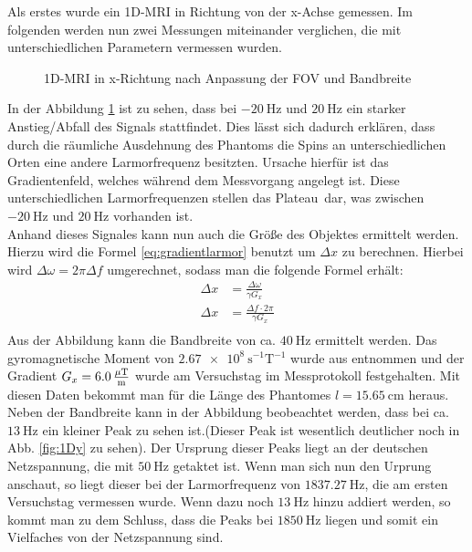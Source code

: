 Als erstes wurde ein 1D-MRI in Richtung von der x-Achse gemessen.
Im folgenden werden nun zwei Messungen miteinander verglichen, die mit unterschiedlichen Parametern vermessen wurden.  
\begin{figure}[H]
    \centering
    
    \caption{1D-MRI in x-Richtung nach Anpassung der FOV und Bandbreite}\label{fig:1Dx}
\end{figure}
In der Abbildung \ref{fig:1Dx} ist zu sehen, dass bei $\SI{-20}{\hertz}$ und $\SI{20}{\hertz}$ ein starker Anstieg/Abfall des Signals stattfindet. Dies lässt sich dadurch erklären, dass durch die räumliche Ausdehnung des Phantoms die Spins an unterschiedlichen Orten eine andere Larmorfrequenz besitzten. Ursache hierfür ist das Gradientenfeld, welches während dem Messvorgang angelegt ist. Diese unterschiedlichen Larmorfrequenzen stellen das \glqq Plateau\grqq \, dar, was zwischen $\SI{-20}{\hertz}$ und $\SI{20}{\hertz}$ vorhanden ist.\\
Anhand dieses Signales kann  nun auch die Größe des Objektes ermittelt werden. Hierzu wird die Formel \ref{eq:gradientlarmor} benutzt um $\Delta x$ zu berechnen. Hierbei wird $\Delta\omega= 2\pi \Delta f$ umgerechnet, sodass man die folgende Formel erhält:
\begin{align}
    \Delta x&=\frac{\Delta\omega}{\gamma G_x}\\
    \Delta x&=\frac{\Delta f \cdot 2\pi}{\gamma G_x}\\
\end{align}\label{eq:FOV}
Aus der Abbildung kann die Bandbreite von ca. $\SI{40}{\hertz}$ ermittelt werden. Das gyromagnetische Moment von $\SI{2.67e8}{\s^{-1}\tesla^{-1}}$ wurde aus \cite{Schmidt} entnommen und der Gradient $G_x=\SI{6,0}{\frac{\mu\tesla}{\m}}$ wurde am Versuchstag im Messprotokoll festgehalten. Mit diesen Daten bekommt man für die Länge des Phantomes $l=\SI{15,65}{\centi\m}$ heraus.\\
Neben der Bandbreite kann in der Abbildung beobeachtet werden, dass bei ca. $\SI{13}{\hertz}$ ein kleiner Peak zu sehen ist.(Dieser Peak ist wesentlich deutlicher noch in Abb. \ref{fig:1Dy} zu sehen). Der Ursprung dieser Peaks liegt an der deutschen Netzspannung, die mit $\SI{50}{\hertz}$ getaktet ist. Wenn man sich nun den Urprung anschaut, so liegt dieser bei der Larmorfrequenz von $\SI{1837,27}{\hertz}$, die am ersten Versuchstag vermessen wurde. Wenn dazu noch $\SI{13}{\hertz}$ hinzu addiert werden, so  kommt man zu dem Schluss, dass die Peaks bei $\SI{1850}{\hertz}$ liegen und somit ein Vielfaches von der Netzspannung sind.\\
